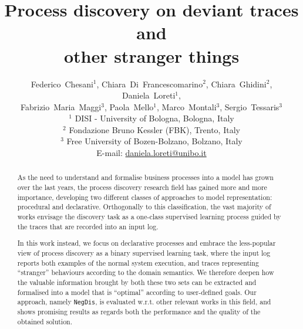 \documentclass[a4wide,11pt]{article}
\theoremstyle{definition}
\theoremstyle{plain}
\newcommand{\nd}{\texttt{NegDis}\xspace}
\begin{document}
\title{Process discovery on deviant traces and \\ other stranger things}

\author{Federico~Chesani$^1$, Chiara~Di~Francescomarino$^2$, Chiara~Ghidini$^2$, Daniela~Loreti$^1$, \\
Fabrizio~Maria~Maggi$^3$, Paola~Mello$^1$, Marco~Montali$^3$, Sergio~Tessaris$^3$\\
$^1$ DISI - University of Bologna, Bologna, Italy\\ 
$^2$ Fondazione Bruno Kessler (FBK), Trento, Italy \\
$^3$ Free University of Bozen-Bolzano, Bolzano, Italy \\
E-mail: \url{daniela.loreti@unibo.it}
}

\date{}

\maketitle


\begin{abstract}
As the need to understand and formalise business processes into a model has grown over the last years, 
the process discovery research field has gained more and more importance, developing two different classes of approaches to model representation: procedural and declarative. 
%
Orthogonally to this classification, the vast majority of works envisage the discovery task as a one-class supervised learning process guided by the traces that are recorded into an input log. 

In this work instead, we focus on declarative processes and embrace the less-popular view of process discovery as a binary supervised learning task, where the input log reports both examples of the normal system execution, and traces representing ``stranger'' behaviours according to the domain semantics. We therefore deepen how the valuable information brought by both these two sets can be extracted and formalised into a model that is ``optimal'' according to user-defined goals. Our approach, namely \nd, is evaluated w.r.t. other relevant works in this field, and shows promising results as regards both the performance and the quality of the obtained solution.
\end{abstract}


\end{document}
